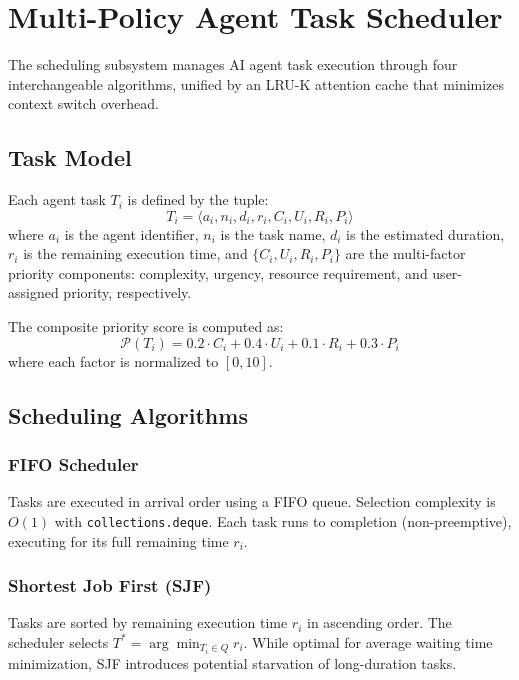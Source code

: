 \documentclass[conference]{IEEEtran}
\begin{document}

\section{Multi-Policy Agent Task Scheduler}
\label{sec:scheduler}

The scheduling subsystem manages AI agent task execution through four interchangeable algorithms, unified by an LRU-K attention cache that minimizes context switch overhead.

\subsection{Task Model}

Each agent task $T_i$ is defined by the tuple:
\begin{equation}
T_i = \langle a_i, n_i, d_i, r_i, C_i, U_i, R_i, P_i \rangle
\end{equation}
where $a_i$ is the agent identifier, $n_i$ is the task name, $d_i$ is the estimated duration, $r_i$ is the remaining execution time, and $\{C_i, U_i, R_i, P_i\}$ are the multi-factor priority components: complexity, urgency, resource requirement, and user-assigned priority, respectively.

The composite priority score is computed as:
\begin{equation}
\label{eq:priority}
\mathcal{P}(T_i) = 0.2 \cdot C_i + 0.4 \cdot U_i + 0.1 \cdot R_i + 0.3 \cdot P_i
\end{equation}
where each factor is normalized to $[0, 10]$.

\subsection{Scheduling Algorithms}

\subsubsection{FIFO Scheduler}
Tasks are executed in arrival order using a FIFO queue. Selection complexity is $O(1)$ with \texttt{collections.deque}. Each task runs to completion (non-preemptive), executing for its full remaining time $r_i$.

\subsubsection{Shortest Job First (SJF)}
Tasks are sorted by remaining execution time $r_i$ in ascending order. The scheduler selects $T^* = \arg\min_{T_i \in Q} r_i$. While optimal for average waiting time minimization, SJF introduces potential starvation of long-duration tasks.
\end{document}
